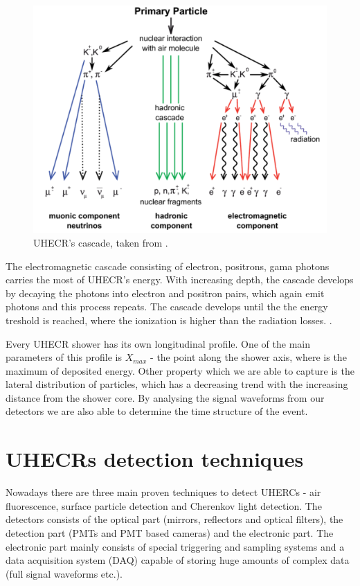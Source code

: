 \begin{figure}[H]
 \centering
 \includegraphics[scale = 0.3]{./pictures/cascade}
 \caption{UHECR's cascade, taken from \cite{Cascades}.}
 \label{cascade}
 
\end{figure}

\par

The electromagnetic cascade consisting of electron, positrons, gama photons carries the most of UHECR's energy. With increasing depth, the cascade develops by decaying the photons into electron and positron pairs, which again emit photons and this process repeats. The cascade develops until the the energy treshold is reached, where the ionization is higher than the radiation losses. \cite{Tomankova2016_1000061954}.


\par
Every UHECR shower has its own longitudinal profile. One of the main parameters of this profile is $X_{max}$ - the point along the shower axis, where is the maximum of deposited energy. Other property which we are able to capture is the lateral distribution of particles, which has a decreasing trend with the increasing distance from the shower core. By analysing the signal waveforms from our detectors we are also able to determine the time structure of the event.

\section{UHECRs detection techniques}
Nowadays there are three main proven techniques to detect UHERCs - 
air fluorescence, surface particle detection and Cherenkov light detection. The detectors consists of the optical part (mirrors, reflectors and optical filters), the detection part (PMTs and PMT based cameras) and the electronic part. The electronic part mainly consists of special triggering and sampling systems and a data acquisition system (DAQ) capable of storing huge amounts of complex data (full signal waveforms etc.).

